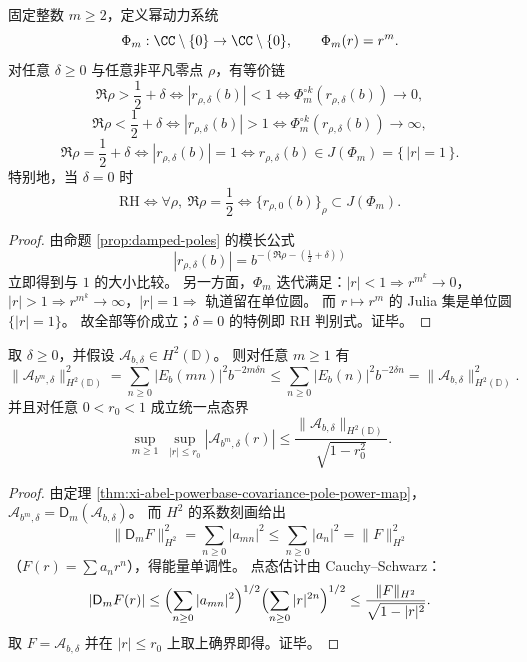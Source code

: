 \begin{theorem}\label{thm:xi-abel-pole-julia-rigidity}
固定整数 \(m\ge 2\)，定义幂动力系统
\[
\Phi_m:\CC\setminus\{0\}\to\CC\setminus\{0\},\qquad \Phi_m(r)=r^m.
\]
对任意 \(\delta\ge 0\) 与任意非平凡零点 \(\rho\)，有等价链
\[
\Re\rho>\frac12+\delta
\Longleftrightarrow
|r_{\rho,\delta}(b)|<1
\Longleftrightarrow
\Phi_m^{\circ k}(r_{\rho,\delta}(b))\to 0,
\]
\[
\Re\rho<\frac12+\delta
\Longleftrightarrow
|r_{\rho,\delta}(b)|>1
\Longleftrightarrow
\Phi_m^{\circ k}(r_{\rho,\delta}(b))\to \infty,
\]
\[
\Re\rho=\frac12+\delta
\Longleftrightarrow
|r_{\rho,\delta}(b)|=1
\Longleftrightarrow
r_{\rho,\delta}(b)\in J(\Phi_m)=\{\,|r|=1\,\}.
\]
特别地，当 \(\delta=0\) 时
\[
\mathrm{RH}
\Longleftrightarrow
\forall\rho,\ \Re\rho=\frac12
\Longleftrightarrow
\{r_{\rho,0}(b)\}_{\rho}\subset J(\Phi_m).
\]
\end{theorem}

\begin{proof}
由命题 \ref{prop:damped-poles} 的模长公式
\[
|r_{\rho,\delta}(b)|
=b^{-(\Re\rho-(\frac12+\delta))}
\]
立即得到与 \(1\) 的大小比较。
另一方面，\(\Phi_m\) 迭代满足：\(|r|<1\Rightarrow r^{m^k}\to 0\)，\(|r|>1\Rightarrow r^{m^k}\to\infty\)，\(|r|=1\Rightarrow\) 轨道留在单位圆。
而 \(r\mapsto r^m\) 的 Julia 集是单位圆 \(\{|r|=1\}\)。
故全部等价成立；\(\delta=0\) 的特例即 RH 判别式。证毕。
\end{proof}

\begin{proposition}\label{prop:xi-abel-hardy-energy-monotone-uniform-bound}
取 \(\delta\ge 0\)，并假设 \(\mathcal A_{b,\delta}\in H^2(\mathbb D)\)。
则对任意 \(m\ge 1\) 有
\[
\|\mathcal A_{b^m,\delta}\|_{H^2(\mathbb D)}^2
=\sum_{n\ge 0}|E_b(mn)|^2 b^{-2m\delta n}
\le
\sum_{n\ge 0}|E_b(n)|^2 b^{-2\delta n}
=\|\mathcal A_{b,\delta}\|_{H^2(\mathbb D)}^2.
\]
并且对任意 \(0<r_0<1\) 成立统一点态界
\[
\sup_{m\ge 1}\ \sup_{|r|\le r_0}|\mathcal A_{b^m,\delta}(r)|
\le
\frac{\|\mathcal A_{b,\delta}\|_{H^2(\mathbb D)}}{\sqrt{1-r_0^2}}.
\]
\end{proposition}

\begin{proof}
由定理 \ref{thm:xi-abel-powerbase-covariance-pole-power-map}，
\(
\mathcal A_{b^m,\delta}=\mathsf D_m(\mathcal A_{b,\delta})
\)。
而 \(H^2\) 的系数刻画给出
\[
\|\mathsf D_m F\|_{H^2}^2=\sum_{n\ge 0}|a_{mn}|^2\le \sum_{n\ge 0}|a_n|^2=\|F\|_{H^2}^2
\]
（\(F(r)=\sum a_n r^n\)），得能量单调性。
点态估计由 Cauchy--Schwarz：
\[
|\mathsf D_mF(r)|
\le \Bigl(\sum_{n\ge 0}|a_{mn}|^2\Bigr)^{1/2}
\Bigl(\sum_{n\ge 0}|r|^{2n}\Bigr)^{1/2}
\le \frac{\|F\|_{H^2}}{\sqrt{1-|r|^2}}.
\]
取 \(F=\mathcal A_{b,\delta}\) 并在 \(|r|\le r_0\) 上取上确界即得。证毕。
\end{proof}

